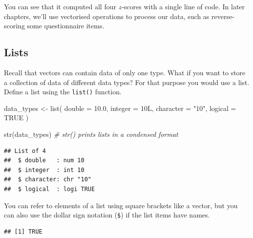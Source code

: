 \documentclass[
  oneside]{book}
\newenvironment{Shaded}{\begin{snugshade}}{\end{snugshade}}
\newcommand{\AttributeTok}[1]{\textcolor[rgb]{0.77,0.63,0.00}{#1}}
\newcommand{\CommentTok}[1]{\textcolor[rgb]{0.56,0.35,0.01}{\textit{#1}}}
\newcommand{\ConstantTok}[1]{\textcolor[rgb]{0.00,0.00,0.00}{#1}}
\newcommand{\FloatTok}[1]{\textcolor[rgb]{0.00,0.00,0.81}{#1}}
\newcommand{\FunctionTok}[1]{\textcolor[rgb]{0.00,0.00,0.00}{#1}}
\newcommand{\NormalTok}[1]{#1}
\newcommand{\OtherTok}[1]{\textcolor[rgb]{0.56,0.35,0.01}{#1}}
\newcommand{\SpecialCharTok}[1]{\textcolor[rgb]{0.00,0.00,0.00}{#1}}
\newcommand{\StringTok}[1]{\textcolor[rgb]{0.31,0.60,0.02}{#1}}
\begin{document}
You can see that it computed all four \(z\)-scores with a single line of code. In later chapters, we'll use vectorised operations to process our data, such as reverse-scoring some questionnaire items.

\hypertarget{lists}{%
\subsection{Lists}\label{lists}}

Recall that vectors can contain data of only one type. What if you want to store a collection of data of different data types? For that purpose you would use a list. Define a list using the \texttt{list()} function.

\begin{Shaded}
\begin{Highlighting}[]
\NormalTok{data\_types }\OtherTok{\textless{}{-}} \FunctionTok{list}\NormalTok{(}
  \AttributeTok{double =} \FloatTok{10.0}\NormalTok{,}
  \AttributeTok{integer =}\NormalTok{ 10L,}
  \AttributeTok{character =} \StringTok{"10"}\NormalTok{,}
  \AttributeTok{logical =} \ConstantTok{TRUE}
\NormalTok{)}

\FunctionTok{str}\NormalTok{(data\_types) }\CommentTok{\# str() prints lists in a condensed format}
\end{Highlighting}
\end{Shaded}

\begin{verbatim}
## List of 4
##  $ double   : num 10
##  $ integer  : int 10
##  $ character: chr "10"
##  $ logical  : logi TRUE
\end{verbatim}

You can refer to elements of a list using square brackets like a vector, but you can also use the dollar sign notation (\texttt{\$}) if the list items have names.

\begin{Shaded}
\end{Shaded}

\begin{verbatim}
## [1] TRUE
\end{verbatim}
\end{document}
